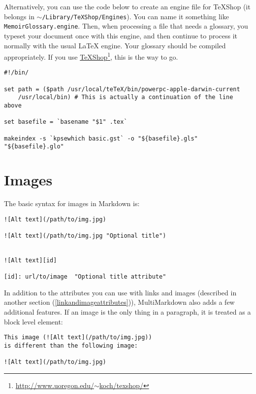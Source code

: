 Alternatively, you can use the code below to create an engine file for TeXShop (it belongs in \texttt{\ensuremath{\sim}\slash Library\slash TeXShop\slash Engines}). You can name it something like \texttt{MemoirGlossary.engine}. Then, when processing a file that needs a glossary, you typeset your document once with this engine, and then continue to process it normally with the usual LaTeX engine. Your glossary should be compiled appropriately. If you use \href{http://www.uoregon.edu/~koch/texshop/}{TeXShop}\footnote{\href{http://www.uoregon.edu/~koch/texshop/}{http:\slash \slash www.uoregon.edu\slash \ensuremath{\sim}koch\slash texshop\slash }}, this is the way to go.

\begin{verbatim}
#!/bin/	

set path = ($path /usr/local/teTeX/bin/powerpc-apple-darwin-current 
	/usr/local/bin) # This is actually a continuation of the line above

set basefile = `basename "$1" .tex`

makeindex -s `kpsewhich basic.gst` -o "${basefile}.gls" "${basefile}.glo"
\end{verbatim}

\section{Images}
\label{images}

The basic syntax for images in Markdown is:

\begin{verbatim}
![Alt text](/path/to/img.jpg)

![Alt text](/path/to/img.jpg "Optional title")


![Alt text][id]

[id]: url/to/image  "Optional title attribute"
\end{verbatim}

In addition to the attributes you can use with links and images (described in another section (\autoref{linkandimageattributes})), MultiMarkdown also adds a few additional features. If an image is the only thing in a paragraph, it is treated as a block level element:

\begin{verbatim}
This image (![Alt text](/path/to/img.jpg))
is different than the following image:

![Alt text](/path/to/img.jpg)
\end{verbatim}

